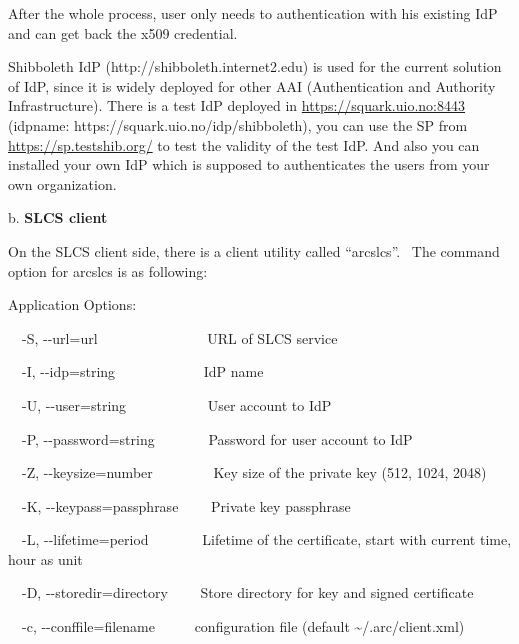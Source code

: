\documentclass{article}
\begin{document}
{\color{black}
After the whole process, user only needs to authentication with his
existing IdP and can get back the x509 credential.}

{\color{black}
Shibboleth IdP (http://shibboleth.internet2.edu) is used for the current
solution of IdP, since it is widely deployed for other AAI
(Authentication and Authority Infrastructure). There is a test IdP
deployed in
\href{https://squark.uio.no:8443/}{https://squark.uio.no:8443}
(idpname: https://squark.uio.no/idp/shibboleth), you can use the SP
from \url{https://sp.testshib.org/} to test the validity of the test
IdP. And also you can installed your own IdP which is supposed to
authenticates the users from your own organization.}

{\color{black}
b. \textbf{SLCS client}}

{\color{black}
On the SLCS client side, there is a client utility called
{\textquotedblleft}arcslcs{\textquotedblright}. \ The command option
for arcslcs is as following:}

{\color{black}
Application Options: }

{\color{black}
\ \ {}-S, -{}-url=url \ \ \ \ \ \ \ \ \ \ \ \ \ \ \ URL of SLCS service
}

{\color{black}
\ \ {}-I, -{}-idp=string \ \ \ \ \ \ \ \ \ \ \ \ IdP name }

{\color{black}
\ \ {}-U, -{}-user=string \ \ \ \ \ \ \ \ \ \ \ User account to IdP }

{\color{black}
\ \ {}-P, -{}-password=string \ \ \ \ \ \ \ Password for user account to
IdP }

{\color{black}
\ \ {}-Z, -{}-keysize=number \ \ \ \ \ \ \ \ Key size of the private key
(512, 1024, 2048) }

{\color{black}
\ \ {}-K, -{}-keypass=passphrase \ \ \ \ Private key passphrase }

{\color{black}
\ \ {}-L, -{}-lifetime=period \ \ \ \ \ \ \ Lifetime of the certificate,
start with current time, hour as unit }

{\color{black}
\ \ {}-D, -{}-storedir=directory \ \ \ \ Store directory for key and
signed certificate }

{\color{black}
\ \ {}-c, -{}-conffile=filename \ \ \ \ \ configuration file (default
\~{}/.arc/client.xml) }
\end{document}
